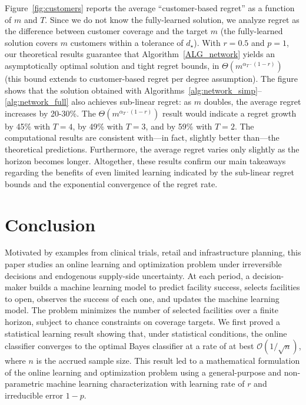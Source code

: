 \documentclass[nonblindrev]{informs3noheader}
\def\calO{\mathcal{O}}
\begin{document}
Figure~\ref{fig:customers} reports the average ``customer-based regret'' as a function of $m$ and $T$. Since we do not know the fully-learned solution, we analyze regret as the difference between customer coverage and the target $m$ (the fully-learned solution covers $m$ customers within a tolerance of $d_\star$). With $r=0.5$ and $p=1$, our theoretical results guarantee that Algorithm~\ref{ALG_network} yields an asymptotically optimal solution and tight regret bounds, in $\Theta\left(m^{\alpha_T\cdot(1-r)}\right)$ (this bound extends to customer-based regret per degree assumption). The figure shows that the solution obtained with Algorithms~\ref{alg:network_simp}--\ref{alg:network_full} also achieves sub-linear regret: as $m$ doubles, the average regret increases by 20-30\%. The $\Theta\left(m^{\alpha_T\cdot(1-r)}\right)$ result would indicate a regret growth by 45\% with $T=4$, by 49\% with $T=3$, and by 59\% with $T=2$. The computational results are consistent with---in fact, slightly better than---the theoretical predictions. Furthermore, the average regret varies only slightly as the horizon becomes longer. Altogether, these results confirm our main takeaways regarding the benefits of even limited learning indicated by the sub-linear regret bounds and the exponential convergence of the regret rate.

\section{Conclusion}

Motivated by examples from clinical trials, retail and infrastructure planning, this paper studies an online learning and optimization problem under irreversible decisions and endogenous supply-side uncertainty. At each period, a decision-maker builds a machine learning model to predict facility success, selects facilities to open, observes the success of each one, and updates the machine learning model. The problem minimizes the number of selected facilities over a finite horizon, subject to chance constraints on coverage targets. We first proved a statistical learning result showing that, under statistical conditions, the online classifier converges to the optimal Bayes classifier at a rate of at best $\calO(1/\sqrt n)$, where $n$ is the accrued sample size. This result led to a mathematical formulation of the online learning and optimization problem using a general-purpose and non-parametric machine learning characterization with learning rate of $r$ and irreducible error $1-p$.
\end{document}
